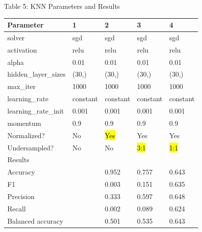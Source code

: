 \documentclass{article}
\begin{document}
\begin{table}
	
	\centering
	Table 5: KNN Parameters and Results\\
	\begin{tabular}{ l l l l l }
		\hline
		Parameter & 1 & 2 & 3 & 4\\
		\hline
		solver & sgd & sgd & sgd & sgd\\
		activation & relu & relu & relu & relu\\
		alpha & 0.01 & 0.01 & 0.01 & 0.01\\
		hidden\_layer\_sizes & (30,) & (30,) & (30,) & (30,)\\
		max\_iter & 1000 & 1000 & 1000 & 1000\\
		learning\_rate & constant & constant & constant & constant \\
		learning\_rate\_init & 0.001 & 0.001 & 0.001 & 0.001 \\
		momentum & 0.9 & 0.9 & 0.9 & 0.9 \\
		Normalized? & No & \hl{Yes} & Yes & Yes\\
		Undersampled? & No & No & \hl{3:1} & \hl{1:1}\\
		\hline
		Results & & & & \\
		\hline
		Accuracy & & 0.952 & 0.757 & 0.643 \\
		F1 &  & 0.003 & 0.151 & 0.635 \\
		Precision & & 0.333 & 0.597 & 0.648  \\
		Recall & & 0.002 & 0.089 & 0.624 \\
		Balanced accuracy & & 0.501 & 0.535 & 0.643 \\
		
		\hline 
	\end{tabular}
\end{table}
\end{document}

